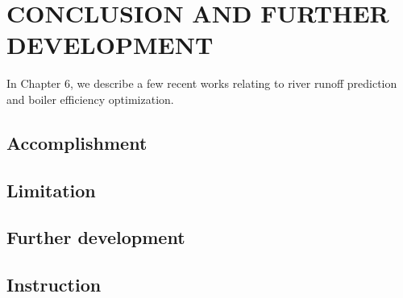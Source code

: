 \chapter{CONCLUSION AND FURTHER DEVELOPMENT}
\label{chap:relatedwork}

In Chapter 6, we describe a few recent works relating to river runoff prediction and boiler efficiency optimization.

\minitoc

\section{Accomplishment}
\section{Limitation}
\section{Further development}
\section{Instruction}
